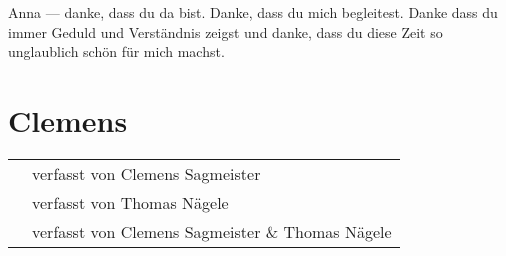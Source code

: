 Anna --- danke, dass du da bist. Danke, dass du mich begleitest. Danke dass du immer Geduld und Verständnis zeigst und danke, dass du diese Zeit so unglaublich schön für mich machst. 

\vfill

\chapter*{Clemens}

\endgroup


\hfill

\vfill

\vspace*{0.5cm}

\begin{center}
\begin{footnotesize}
	\textcolor{Gray}{
		\begin{tabular}{rp{7cm}}
			\cs & verfasst von Clemens Sagmeister \\
			\tn & verfasst von Thomas Nägele \\
			\cs \tn & verfasst von Clemens Sagmeister \& Thomas Nägele \\
		\end{tabular} }
\end{footnotesize}
\end{center}


